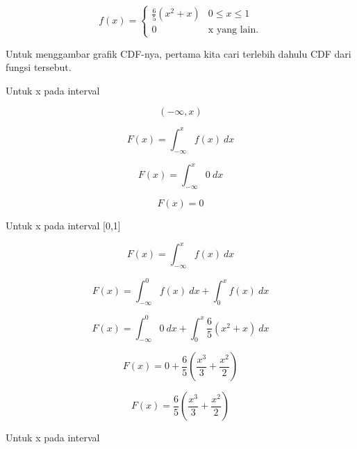 \documentclass{article}
\begin{document}
\begin{eulernotebook}
\begin{eulercomment}
\begin{eulercomment}
\begin{eulercomment}
\begin{eulercomment}
\begin{eulercomment}
\end{eulercomment}
\begin{eulerformula}
\[
f(x) = \begin{cases} \frac{6}{5}(x^2+x) & 0\le x\le 1 \\ 0 & \text{x yang lain}. \end{cases}
\]
\end{eulerformula}
\begin{eulercomment}
Untuk menggambar grafik CDF-nya, pertama kita cari terlebih dahulu CDF
dari fungsi tersebut.

Untuk x pada interval\\
\end{eulercomment}
\begin{eulerformula}
\[
(- \infty,x)
\]
\end{eulerformula}
\begin{eulerformula}
\[
F(x)= \int_{- \infty}^{x} f(x)\ dx
\]
\end{eulerformula}
\begin{eulerformula}
\[
F(x)= \int_{- \infty}^{x} 0\ dx
\]
\end{eulerformula}
\begin{eulerformula}
\[
F(x)= 0
\]
\end{eulerformula}
\begin{eulercomment}
Untuk x pada interval [0,1]\\
\end{eulercomment}
\begin{eulerformula}
\[
F(x)= \int_{- \infty}^{x} f(x)\ dx
\]
\end{eulerformula}
\begin{eulerformula}
\[
F(x)= \int_{- \infty}^{0} f(x)\ dx + \int_{0}^{x} f(x)\ dx
\]
\end{eulerformula}
\begin{eulerformula}
\[
F(x)= \int_{- \infty}^{0} 0\ dx + \int_{0}^{x} \frac{6}{5} (x^2+x)\ dx
\]
\end{eulerformula}
\begin{eulerformula}
\[
F(x) = 0 + \frac{6}{5}(\frac{x^3}{3} + \frac{x^2}{2})
\]
\end{eulerformula}
\begin{eulerformula}
\[
F(x) = \frac{6}{5}(\frac{x^3}{3} + \frac{x^2}{2})
\]
\end{eulerformula}
\begin{eulercomment}
Untuk x pada interval\\
\end{eulercomment}
\begin{eulerformula}

\end{eulerformula}
\end{eulercomment}
\end{eulercomment}
\end{eulercomment}
\end{eulercomment}
\end{eulernotebook}
\end{document}
